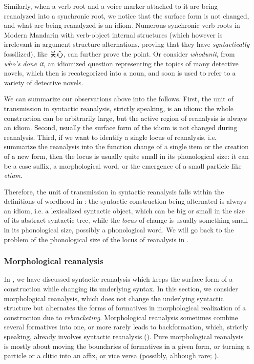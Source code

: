 \documentclass[a4paper, oneside, scheme=plain, 12pt]{article}
\newcommand*{\citepages}[1]{pp.~{#1}}
\newcommand{\form}[1]{\emph{#1}}
\begin{document}
Similarly, when a verb root and a voice marker attached to it are being
reanalyzed into a synchronic root,
we notice that the surface form is not changed,
and what are being reanalyzed is an idiom.
Numerous synchronic verb roots in Modern Mandarin with verb-object internal structures
(which however is irrelevant in argument structure alternations,
proving that they have \emph{syntactically} fossilized),
like 关心, can further prove the point.
Or consider \form{whodunit}, from \form{who's done it},
an idiomized question representing the topics of many detective novels,
which then is recategorized into a noun,
and soon is used to refer to a variety of detective novels.

We can summarize our observations above into the follows.
First, the unit of transmission in syntactic reanalysis,
strictly speaking, is an idiom:
the whole construction can be arbitrarily large,
but the active region of reanalysis is always an idiom.
Second, usually the surface form of the idiom is not changed during reanalysis.
Third, if we want to identify a single locus of reanalysis,
i.e. summarize the reanalysis into the function change of a single item
or the creation of a new form,
then the locus is usually quite small in its phonological size:
it can be a case suffix, a morphological word, or the emergence of a small particle like \form{etiam}.

Therefore, the unit of transmission in syntactic reanalysis
falls within the definitions of wordhood in :
the syntactic construction being alternated is always an idiom, i.e. a lexicalized syntactic object,
which can be big or small in the size of its abstract syntactic tree,
while the \emph{locus} of change is usually something small in its phonological size,
possibly a phonological word.
We will go back to the problem of the phonological size of the locus of reanalysis in .

\subsubsection{Morphological reanalysis}\label{sec:reanalysis-form-change}

In ,
we have discussed syntactic reanalysis which keeps the surface form of a construction
while changing its underlying syntax.
In this section, we consider morphological reanalysis,
which does not change the underlying syntactic structure
but alternates the forms of formatives in morphological realization of a construction
due to \emph{rebracketing}.
Morphological reanalysis sometimes combine several formatives into one,
or more rarely leads to backformation,
which, strictly speaking, already involves syntactic reanalysis
().
Pure morphological reanalysis is mostly about moving the boundaries of formatives in a given form,
or turning a particle or a clitic into an affix, or vice versa
(possibly, although rare; \citealt[\citepages{251}]{campbell2013historical}).
\end{document}
